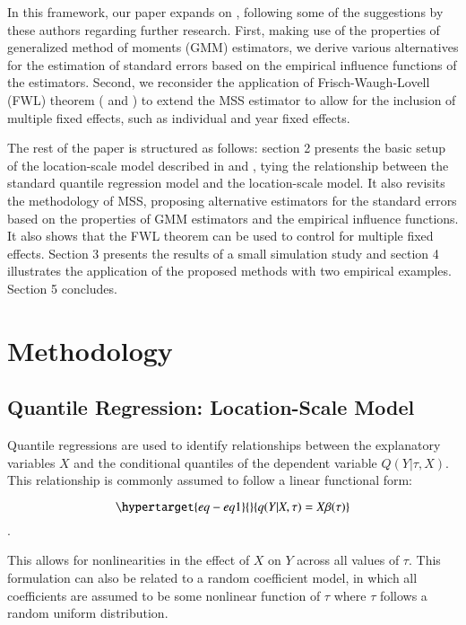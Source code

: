 \documentclass[
  authoryear,
  review,
  1p]{elsarticle}
\begin{document}
In this framework, our paper expands on \citet{mss2019}, following some
of the suggestions by these authors regarding further research. First,
making use of the properties of generalized method of moments (GMM) estimators, we derive various
alternatives for the estimation of standard errors based on the
empirical influence functions of the estimators. Second, we reconsider
the application of Frisch-Waugh-Lovell (FWL) theorem
(\citet{frishwaugh1933} and \citet{lovell1963}) to extend the MSS
estimator to allow for the inclusion of multiple fixed effects, such as individual and year fixed effects.

The rest of the paper is structured as follows: section 2 presents the
basic setup of the location-scale model described in \citet{he1997} and
\citet{zhao2000}, tying the relationship between the standard quantile
regression model and the location-scale model. It also revisits the
methodology of MSS, proposing alternative estimators for the standard errors
based on the properties of GMM estimators and the empirical influence
functions. It also shows that the FWL theorem can be used to control for
multiple fixed effects. Section 3 presents the results of a small
simulation study and section 4 illustrates the application of the
proposed methods with two empirical examples. Section 5 concludes.

\hypertarget{sec-method}{%
\section{Methodology}\label{sec-method}}

\hypertarget{sec-betas}{%
\subsection{Quantile Regression: Location-Scale Model}\label{sec-betas}}

Quantile regressions are used to identify relationships between the
explanatory variables \(X\) and the conditional quantiles of the
dependent variable \(Q(Y|\tau,X)\). This relationship is commonly
assumed to follow a linear functional form:

\begin{equation}\protect\hypertarget{eq-eq1}{}{q(Y|X,\tau) =X\beta(\tau)
}\label{eq-eq1}\end{equation}.

This allows for nonlinearities in the effect of \(X\) on \(Y\) across
all values of \(\tau\). This formulation can also be related to a random
coefficient model, in which all coefficients are assumed to be some
nonlinear function of \(\tau\) where \(\tau\) follows a random uniform
distribution.
\end{document}
